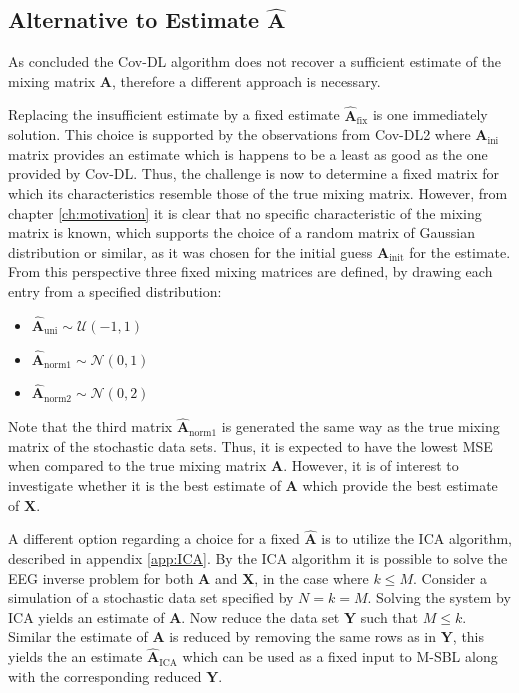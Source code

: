 \subsection{Alternative to Estimate $\hat{\textbf{A}}$}  
As concluded the Cov-DL algorithm does not recover a sufficient estimate of the mixing matrix $\mathbf{A}$, therefore a different approach is necessary. 

Replacing the insufficient estimate by a fixed estimate $\hat{\mathbf{A}}_{\text{fix}}$ is one immediately solution. 
This choice is supported by the observations from Cov-DL2 where $\mathbf{A}_{\text{ini}}$ matrix provides an estimate which is happens to be a least as good as the one provided by Cov-DL. 
Thus, the challenge is now to determine a fixed matrix for which its characteristics resemble those of the true mixing matrix. 
However, from chapter \ref{ch:motivation} it is clear that no specific characteristic of the mixing matrix is known, which supports the choice of a random matrix of Gaussian distribution or similar, as it was chosen for the initial guess $\mathbf{A}_{\text{init}}$ for the estimate. 
From this perspective three fixed mixing matrices are defined, by drawing each entry from a specified distribution: 
\begin{itemize}
\item[] $\hat{\mathbf{A}}_{\text{uni}} \sim \mathcal{U}(-1,1)$
\item[] $\hat{\mathbf{A}}_{\text{norm1}} \sim \mathcal{N}(0,1)$                                           
\item[] $\hat{\mathbf{A}}_{\text{norm2}} \sim \mathcal{N}(0,2)$ 
\end{itemize}
Note that the third matrix $\hat{\mathbf{A}}_{\text{norm1}}$ is generated the same way as the true mixing matrix of the stochastic data sets. 
Thus, it is expected to have the lowest MSE when compared to the true mixing matrix $\mathbf{A}$. 
However, it is of interest to investigate whether it is the best estimate of $\mathbf{A}$ which provide the best estimate of $\mathbf{X}$. 

A different option regarding a choice for a fixed $\hat{\mathbf{A}}$ is to utilize the ICA algorithm, described in appendix \ref{app:ICA}. 
By the ICA algorithm it is possible to solve the EEG inverse problem for both $\mathbf{A}$ and $\mathbf{X}$, in the case where $k \leq M$.
Consider a simulation of a stochastic data set specified by $N = k = M$. 
Solving the system by ICA yields an estimate of $\mathbf{A}$. 
Now reduce the data set $\mathbf{Y}$ such that $M \leq k$. 
Similar the estimate of $\mathbf{A}$ is reduced by removing the same rows as in $\mathbf{Y}$, this yields the an estimate $\hat{\mathbf{A}}_{\text{ICA}}$ which can be used as a fixed input to M-SBL along with the corresponding reduced $\mathbf{Y}$.


